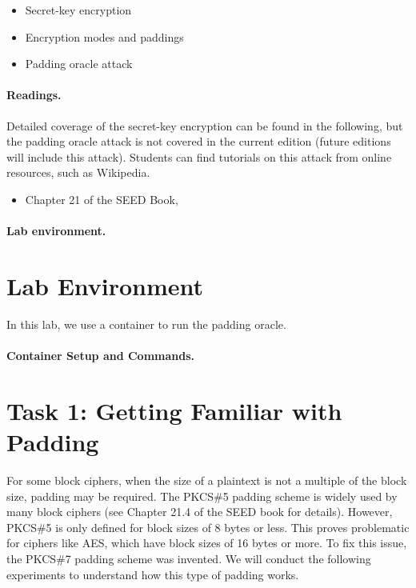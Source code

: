 \begin{itemize}[noitemsep]
\item Secret-key encryption
\item Encryption modes and paddings
\item Padding oracle attack
\end{itemize}


\paragraph{Readings.}
Detailed coverage of the secret-key encryption can be found in the following,
but the padding oracle attack is not covered in the current edition
(future editions will include this attack). Students can find tutorials
on this attack from online resources, such as Wikipedia.

\begin{itemize}
\item Chapter 21 of the SEED Book, \seedbook
\end{itemize}


\paragraph{Lab environment.} \seedenvironmentC


\section{Lab Environment}

In this lab, we use a container to run the padding oracle. 


\paragraph{Container Setup and Commands.}



\section{Task 1: Getting Familiar with Padding}

For some block ciphers, when the size of a plaintext is not a multiple
of the block size, padding may be required.
The PKCS\#5 padding scheme is widely used by many block
ciphers (see Chapter 21.4 of the SEED book for details).
However, PKCS\#5 is only defined for block sizes of 8 bytes or less.
This proves problematic for ciphers like AES, which have block sizes of 16 bytes or more.
To fix this issue, the PKCS\#7 padding scheme was invented.
We will conduct the following experiments to
understand how this type of padding works.

